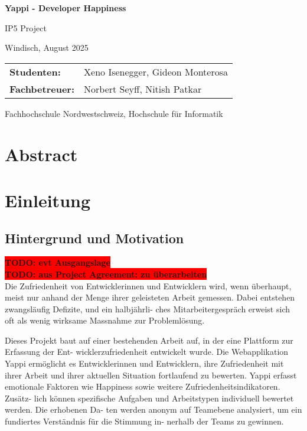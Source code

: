 \documentclass[12pt,a4paper]{report}
\newcommand{\todo}[1]{\colorbox{red}{\textbf{TODO: #1}}\\}
\begin{document}
\begin{titlepage}
	\centering
	{\huge \textbf{Yappi - Developer Happiness} \par}
	{\large IP5 Project \par}
	\vspace{0.5cm}
	{Windisch, August 2025 \par}
	\vspace{0.5cm}

	\begin{tabular}{@{}ll@{}}
		\textbf{Studenten:}    & Xeno Isenegger, Gideon Monterosa \\
		\textbf{Fachbetreuer:} & Norbert Seyff, Nitish Patkar
	\end{tabular}

	\vfill
	{Fachhochschule Nordwestschweiz, Hochschule für Informatik \par}
\end{titlepage}

\chapter*{Abstract}
\newpage

\tableofcontents
\newpage

\listoffigures
\newpage

\listoftables
\newpage

\chapter{Einleitung}

\section{Hintergrund und Motivation}
\todo{evt Ausgangslage}

\todo{aus Project Agreement: zu überarbeiten}

Die Zufriedenheit von Entwicklerinnen und Entwicklern wird, wenn überhaupt, meist nur anhand der
Menge ihrer geleisteten Arbeit gemessen. Dabei entstehen zwangsläufig Defizite, und ein halbjährli-
ches Mitarbeitergespräch erweist sich oft als wenig wirksame Massnahme zur Problemlösung.

Dieses Projekt baut auf einer bestehenden Arbeit auf, in der eine Plattform zur Erfassung der Ent-
wicklerzufriedenheit entwickelt wurde. Die Webapplikation Yappi ermöglicht es Entwicklerinnen und
Entwicklern, ihre Zufriedenheit mit ihrer Arbeit und ihrer aktuellen Situation fortlaufend zu bewerten.
Yappi erfasst emotionale Faktoren wie Happiness sowie weitere Zufriedenheitsindikatoren. Zusätz-
lich können spezifische Aufgaben und Arbeitstypen individuell bewertet werden. Die erhobenen Da-
ten werden anonym auf Teamebene analysiert, um ein fundiertes Verständnis für die Stimmung in-
nerhalb der Teams zu gewinnen.
\end{document}
